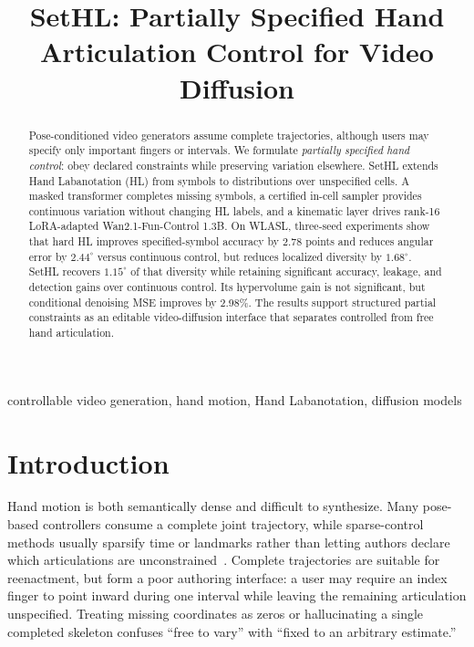 \documentclass{article}
\title{SetHL: Partially Specified Hand Articulation Control for Video Diffusion}
\begin{document}
\maketitle

\begin{abstract}
Pose-conditioned video generators assume complete trajectories, although users
may specify only important fingers or intervals. We formulate
\emph{partially specified hand control}: obey declared constraints while
preserving variation elsewhere. SetHL extends Hand Labanotation (HL) from
symbols to distributions over unspecified cells. A masked transformer completes
missing symbols, a certified in-cell sampler provides continuous variation
without changing HL labels, and a kinematic layer drives rank-16 LoRA-adapted
Wan2.1-Fun-Control 1.3B. On
WLASL, three-seed experiments show that hard HL improves specified-symbol
accuracy by 2.78 points and reduces angular error by $2.44^\circ$ versus
continuous control, but reduces localized diversity by $1.68^\circ$. SetHL
recovers $1.15^\circ$ of that diversity while retaining significant accuracy,
leakage, and detection gains over continuous control. Its hypervolume gain is
not significant, but conditional denoising MSE improves by 2.98\%. The
results support structured partial
constraints as an editable video-diffusion interface that separates controlled
from free hand articulation.
\end{abstract}

\begin{keywords}
controllable video generation, hand motion, Hand Labanotation, diffusion models
\end{keywords}

\section{Introduction}
\label{sec:intro}
Hand motion is both semantically dense and difficult to synthesize.  Many
pose-based controllers consume a complete joint trajectory, while sparse-control
methods usually sparsify time or landmarks rather than letting authors declare
which articulations are unconstrained~\cite{controlnet,sparsectrl,motioni2v,motionctrl}.
Complete trajectories are suitable for reenactment, but form a poor
authoring interface: a user may require an index finger to point inward during
one interval while leaving the remaining articulation unspecified.  Treating
missing coordinates as zeros or hallucinating a single completed skeleton
confuses ``free to vary'' with ``fixed to an arbitrary estimate.''
\end{document}
